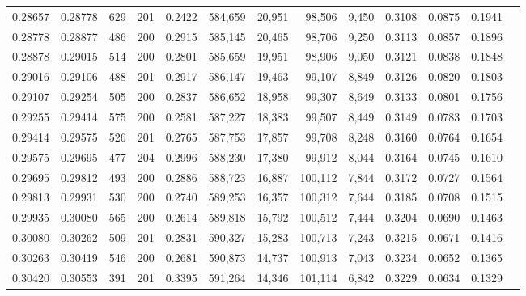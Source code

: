 \begin{tabular}{rrrrrrrrrrrrr}
0.28657 & 0.28778 &   629 & 201 &                                     0.2422 & 584,659 &  20,951 &  98,506 &   9,450 & 0.3108 & 0.0875 & 0.1941 \\
0.28778 & 0.28877 &   486 & 200 &                                     0.2915 & 585,145 &  20,465 &  98,706 &   9,250 & 0.3113 & 0.0857 & 0.1896 \\
0.28878 & 0.29015 &   514 & 200 &                                     0.2801 & 585,659 &  19,951 &  98,906 &   9,050 & 0.3121 & 0.0838 & 0.1848 \\
0.29016 & 0.29106 &   488 & 201 &                                     0.2917 & 586,147 &  19,463 &  99,107 &   8,849 & 0.3126 & 0.0820 & 0.1803 \\
0.29107 & 0.29254 &   505 & 200 &                                     0.2837 & 586,652 &  18,958 &  99,307 &   8,649 & 0.3133 & 0.0801 & 0.1756 \\
0.29255 & 0.29414 &   575 & 200 &                                     0.2581 & 587,227 &  18,383 &  99,507 &   8,449 & 0.3149 & 0.0783 & 0.1703 \\
0.29414 & 0.29575 &   526 & 201 &                                     0.2765 & 587,753 &  17,857 &  99,708 &   8,248 & 0.3160 & 0.0764 & 0.1654 \\
0.29575 & 0.29695 &   477 & 204 &                                     0.2996 & 588,230 &  17,380 &  99,912 &   8,044 & 0.3164 & 0.0745 & 0.1610 \\
0.29695 & 0.29812 &   493 & 200 &                                     0.2886 & 588,723 &  16,887 & 100,112 &   7,844 & 0.3172 & 0.0727 & 0.1564 \\
0.29813 & 0.29931 &   530 & 200 &                                     0.2740 & 589,253 &  16,357 & 100,312 &   7,644 & 0.3185 & 0.0708 & 0.1515 \\
0.29935 & 0.30080 &   565 & 200 &                                     0.2614 & 589,818 &  15,792 & 100,512 &   7,444 & 0.3204 & 0.0690 & 0.1463 \\
0.30080 & 0.30262 &   509 & 201 &                                     0.2831 & 590,327 &  15,283 & 100,713 &   7,243 & 0.3215 & 0.0671 & 0.1416 \\
0.30263 & 0.30419 &   546 & 200 &                                     0.2681 & 590,873 &  14,737 & 100,913 &   7,043 & 0.3234 & 0.0652 & 0.1365 \\
0.30420 & 0.30553 &   391 & 201 &                                     0.3395 & 591,264 &  14,346 & 101,114 &   6,842 & 0.3229 & 0.0634 & 0.1329 \\

\end{tabular}
